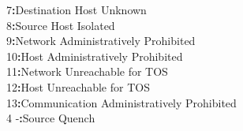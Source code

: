 \documentclass[a4paper,12pt]{article}
\begin{document}
\begin{figure}[H]
			\hspace{8.7mm} \hspace{3.6mm}			7\hspace{8.8mm}\textbf{:}\hspace{2.2mm}Destination Host Unknown\\
			\hspace{8.7mm} \hspace{3.6mm}			8\hspace{8.8mm}\textbf{:}\hspace{2.2mm}Source Host Isolated\\
			\hspace{8.7mm} \hspace{3.6mm}			9\hspace{8.8mm}\textbf{:}\hspace{2.2mm}Network Administratively Prohibited\\
			\hspace{8.7mm} \hspace{3.6mm}			10\hspace{6.8mm}\textbf{:}\hspace{2.2mm}Host Administratively Prohibited\\
			\hspace{8.7mm} \hspace{3.6mm}			11\hspace{6.8mm}\textbf{:}\hspace{2.2mm}Network Unreachable for TOS\\
			\hspace{8.7mm} \hspace{3.6mm}			12\hspace{6.8mm}\textbf{:}\hspace{2.2mm}Host Unreachable for TOS\\
			\hspace{8.7mm} \hspace{3.6mm}			13\hspace{6.8mm}\textbf{:}\hspace{2.2mm}Communication Administratively Prohibited\\
			
			\hspace{8.7mm}4 \hspace{2mm}			-\hspace{8.9mm}\textbf{:}\hspace{2.4mm}Source Quench\\
			

\end{figure}
\end{document}
